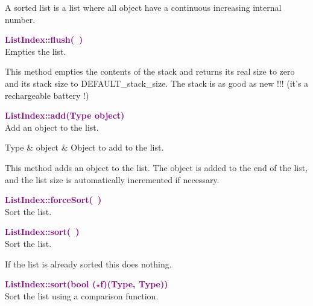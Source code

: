A sorted list is a list where all object have a continuous increasing internal number.

\textcolor{purple}{\textbf{ListIndex::flush(~)}}\label{ListIndex::flush()}\\
Empties the list.

This method empties the contents of the stack and returns its real size to zero and its stack size to DEFAULT\_stack\_size.
The stack is as good as new !!! (it's a rechargeable battery !)

\textcolor{purple}{\textbf{ListIndex::add(Type object)}}\label{ListIndex::add(Type object)}\\
Add an object to the list.

\begin{tcolorbox}[width=\textwidth,myArgs,tabularx={ll|R}]
Type & object & Object to add to the list.
\end{tcolorbox}

This method adds an object to the list. The object is added to the end of the list, and the list size is automatically incremented if necessary.

\textcolor{purple}{\textbf{ListIndex::forceSort(~)}}\label{ListIndex::forceSort()}\\
Sort the list.


\textcolor{purple}{\textbf{ListIndex::sort(~)}}\label{ListIndex::sort()}\\
Sort the list.

If the list is already sorted this does nothing.

\textcolor{purple}{\textbf{ListIndex::sort(bool ($\star$f)(Type, Type))}}\label{ListIndex::sort(bool (*f)(Type, Type))}\\
Sort the list using a comparison function.


